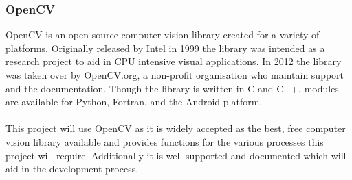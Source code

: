 	\subsubsection{OpenCV}
		OpenCV is an open-source computer vision library created for a variety of platforms. Originally released by Intel in 1999 the library was intended as a research project to aid in CPU intensive visual applications. In 2012 the library was taken over by OpenCV.org, a non-profit organisation who maintain support and the documentation. Though the library is written in C and C++, modules are available for Python, Fortran, and the Android platform.
		\\\\
		This project will use OpenCV as it is widely accepted as the best, free computer vision library available and provides functions for the various processes this project will require. Additionally it is well supported and documented which will aid in the development process.
